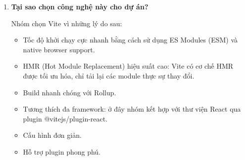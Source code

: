 \begin{enumerate}
	\item \textbf{Tại sao chọn công nghệ này cho dự án?}
	
	Nhóm chọn Vite vì những lý do sau:
	\begin{itemize}
		\item Tốc độ khởi chạy cực nhanh bằng cách sử dụng ES Modules (ESM) và native browser support.
		\item HMR (Hot Module Replacement) hiệu suất cao: Vite có cơ chế HMR được tối ưu hóa, chỉ tải lại các module thực sự thay đổi. 
		\item Build nhanh chóng với Rollup.
		\item Tương thích đa framework: ở đây nhóm kết hợp với thư viện React qua plugin @vitejs/plugin-react.
		\item Cấu hình đơn giản.
		\item Hỗ trợ plugin phong phú.
	\end{itemize}
	
\end{enumerate}
	
	
	
	
